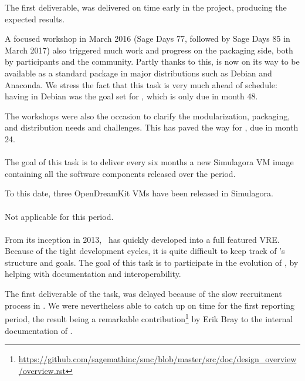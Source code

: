   The first deliverable,
   was
  delivered on time early in the project, producing the expected
  results.

  A focused workshop in March 2016 (Sage Days 77, followed by Sage
  Days 85 in March 2017) also triggered much work and progress on the
  packaging side, both by \ODK participants and the community. Partly
  thanks to this, \Sage is now on its way to be available as a
  standard package in major distributions such as Debian and
  Anaconda. We stress the fact that this task is very much ahead of
  schedule: having \Sage in Debian was the goal set for
  , which is only
  due in month 48.

  The workshops were also the occasion to clarify the modularization,
  packaging, and distribution needs and challenges. This has paved the
  way for , due
  in month 24.

  \paragraph{}
  The goal of this task is to deliver every six months a new Simulagora
  VM image containing all the software components released over the
  period.

  To this date, three OpenDreamKit VMs have been released in
  Simulagora.

  \paragraph{}
Not applicable for this period.

  \paragraph{}
  \label{component-architecture@extract-smc}
  From its inception in 2013, \SMC\ has quickly developed into a full
  featured VRE.  Because of the tight
  development cycles, it is quite difficult to keep track of \SMC's
  structure and goals.  The goal of this task is to participate in the
  evolution of \SMC, by helping with documentation and
  interoperability.

  The first deliverable of the task,
   was delayed
  because of the slow recruitment process in . We were nevertheless able
  to catch up on time for the first reporting period, the result being
  a remarkable
  contribution\footnote{\url{https://github.com/sagemathinc/smc/blob/master/src/doc/design_overview/overview.rst}}
  by Erik Bray to the internal documentation of \SMC.

